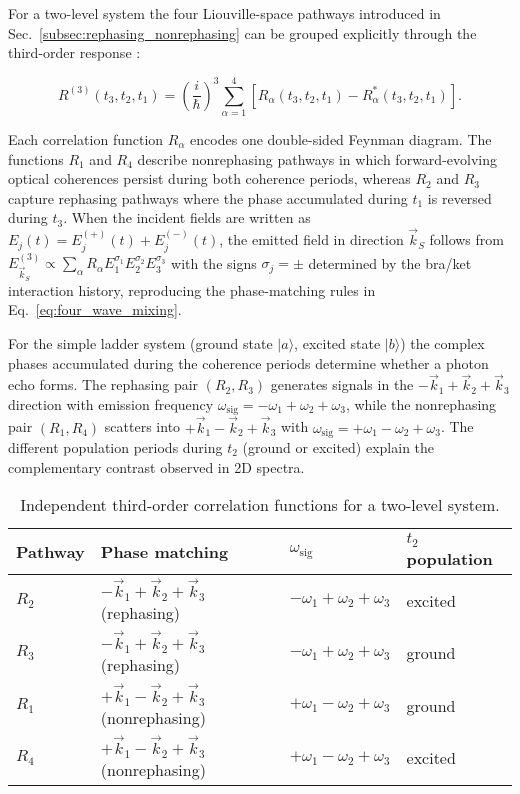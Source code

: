 \noindent
For a two-level system the four Liouville-space pathways introduced in Sec.~\ref{subsec:rephasing_nonrephasing} can be grouped explicitly through the third-order response \cite{mukamel1995principlesnonlinearoptical, cho2009twodimensionalopticalspectroscopy}:

\begin{equation}
\label{eq:third_order_correlation_function}
R^{(3)}(t_3,t_2,t_1)
= \left(\frac{i}{\hbar}\right)^3 \sum_{\alpha=1}^{4} \left[ R_{\alpha}(t_3,t_2,t_1) - R_{\alpha}^{*}(t_3,t_2,t_1) \right].
\end{equation}

\noindent
Each correlation function $R_{\alpha}$ encodes one double-sided Feynman diagram. The functions $R_1$ and $R_4$ describe nonrephasing pathways in which forward-evolving optical coherences persist during both coherence periods, whereas $R_2$ and $R_3$ capture rephasing pathways where the phase accumulated during $t_1$ is reversed during $t_3$. When the incident fields are written as $E_j(t) = E_j^{(+)}(t) + E_j^{(-)}(t)$, the emitted field in direction $\vec{k}_S$ follows from $E^{(3)}_{\vec{k}_S} \propto \sum_{\alpha} R_{\alpha} E_1^{\sigma_1} E_2^{\sigma_2} E_3^{\sigma_3}$ with the signs $\sigma_j = \pm$ determined by the bra/ket interaction history, reproducing the phase-matching rules in Eq.~\eqref{eq:four_wave_mixing}.

\noindent
For the simple ladder system (ground state $\lvert a \rangle$, excited state $\lvert b \rangle$) the complex phases accumulated during the coherence periods determine whether a photon echo forms. The rephasing pair $(R_2,R_3)$ generates signals in the $-\vec{k}_1 + \vec{k}_2 + \vec{k}_3$ direction with emission frequency $\omega_{\text{sig}} = -\omega_1 + \omega_2 + \omega_3$, while the nonrephasing pair $(R_1,R_4)$ scatters into $+\vec{k}_1 - \vec{k}_2 + \vec{k}_3$ with $\omega_{\text{sig}} = +\omega_1 - \omega_2 + \omega_3$. The different population periods during $t_2$ (ground or excited) explain the complementary contrast observed in 2D spectra.

\begin{table}[ht]
	\centering
	\caption{Independent third-order correlation functions for a two-level system.}
	\label{tab:third_order_correlation_functions}
	\begin{tabular}{llll}
		\hline
		Pathway & Phase matching & $\omega_{\text{sig}}$ & $t_2$ population \\ \hline
		$R_2$ & $-\vec{k}_1 + \vec{k}_2 + \vec{k}_3$ (rephasing) & $-\omega_1 + \omega_2 + \omega_3$ & excited \\
		$R_3$ & $-\vec{k}_1 + \vec{k}_2 + \vec{k}_3$ (rephasing) & $-\omega_1 + \omega_2 + \omega_3$ & ground \\
		$R_1$ & $+\vec{k}_1 - \vec{k}_2 + \vec{k}_3$ (nonrephasing) & $+\omega_1 - \omega_2 + \omega_3$ & ground \\
		$R_4$ & $+\vec{k}_1 - \vec{k}_2 + \vec{k}_3$ (nonrephasing) & $+\omega_1 - \omega_2 + \omega_3$ & excited \\
		\hline
	\end{tabular}
\end{table}

